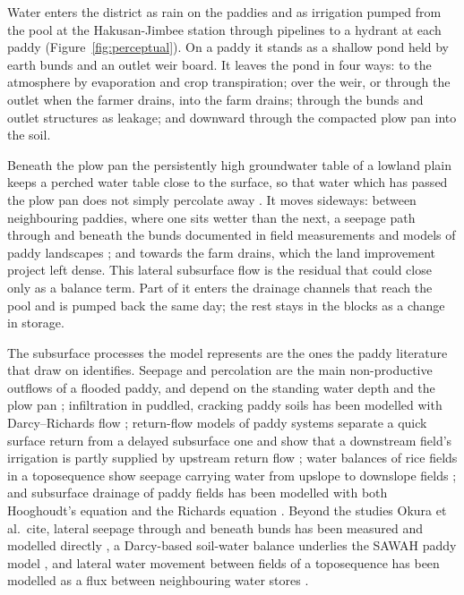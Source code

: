 \documentclass[11pt]{article}
\begin{document}
Water enters the district as rain on the paddies and as irrigation pumped from the pool at the Hakusan-Jimbee station through pipelines to a hydrant at each paddy (Figure~\ref{fig:perceptual}). On a paddy it stands as a shallow pond held by earth bunds and an outlet weir board. It leaves the pond in four ways: to the atmosphere by evaporation and crop transpiration; over the weir, or through the outlet when the farmer drains, into the farm drains; through the bunds and outlet structures as leakage; and downward through the compacted plow pan into the soil.

Beneath the plow pan the persistently high groundwater table of a lowland plain keeps a perched water table close to the surface, so that water which has passed the plow pan does not simply percolate away \citep{Tabuchi1985Paddy, Shiratani2004Subsurface}. It moves sideways: between neighbouring paddies, where one sits wetter than the next, a seepage path through and beneath the bunds documented in field measurements and models of paddy landscapes \citep{Huang2003Bunds, Janssen2007Fluxes, Tsubo2007Toposequence}; and towards the farm drains, which the land improvement project left dense. This lateral subsurface flow is the residual that \citet{Okura2025WaterBalance} could close only as a balance term. Part of it enters the drainage channels that reach the pool and is pumped back the same day; the rest stays in the blocks as a change in storage.

The subsurface processes the model represents are the ones the paddy literature that \citet{Okura2025WaterBalance} draw on identifies. Seepage and percolation are the main non-productive outflows of a flooded paddy, and depend on the standing water depth and the plow pan \citep{BoumanTuong2001}; infiltration in puddled, cracking paddy soils has been modelled with Darcy--Richards flow \citep{Liu2004Cracked}; return-flow models of paddy systems separate a quick surface return from a delayed subsurface one and show that a downstream field's irrigation is partly supplied by upstream return flow \citep{ChienFang2012}; water balances of rice fields in a toposequence show seepage carrying water from upslope to downslope fields \citep{Facchi2018}; and subsurface drainage of paddy fields has been modelled with both Hooghoudt's equation and the Richards equation \citep{Ebrahimian2015Hydrus}. Beyond the studies Okura et al.\ cite, lateral seepage through and beneath bunds has been measured and modelled directly \citep{Huang2003Bunds, Janssen2007Fluxes}, a Darcy-based soil-water balance underlies the SAWAH paddy model \citep{Wopereis1994SAWAH}, and lateral water movement between fields of a toposequence has been modelled as a flux between neighbouring water stores \citep{Tsubo2007Toposequence}.
\end{document}
